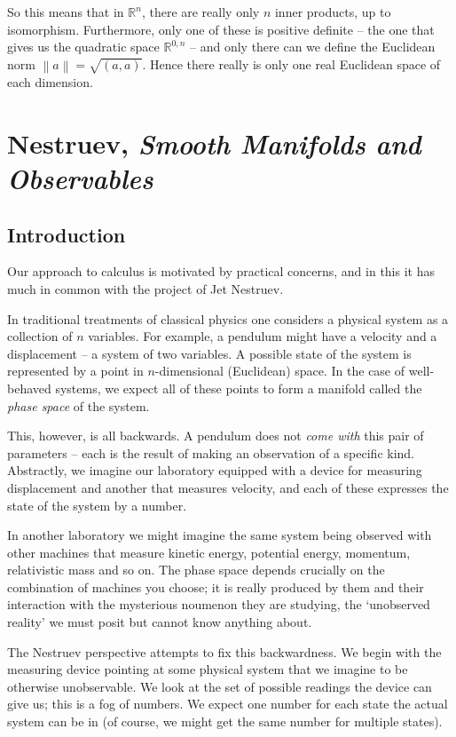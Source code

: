 \documentclass[oneside,english]{amsbook}
\numberwithin{section}{chapter}
\theoremstyle{plain}
\theoremstyle{definition}
\newcommand{\norm}[1]{\left\lVert#1\right\rVert}
\begin{document}
So this means that in $\mathbb{R}^n$, there are really only $n$ inner products, up to isomorphism. Furthermore, only one of these is positive definite -- the one that gives us the quadratic space $\mathbb{R}^{0, n}$ -- and only there can we define the Euclidean norm $\norm{a} = \sqrt{(a, a)}$. Hence there really is only one real Euclidean space of each dimension. 

\chapter{Nestruev, \emph{Smooth Manifolds and Observables}}

\section{Introduction}

Our approach to calculus is motivated by practical concerns, and in this it has much in common with the project of Jet Nestruev.

In traditional treatments of classical physics one considers a physical system as a collection of $n$ variables. For example, a pendulum might have a velocity and a displacement -- a system of two variables. A possible state of the system is represented by a point in $n$-dimensional (Euclidean) space. In the case of well-behaved systems, we expect all of these points to form a manifold called the \emph{phase space} of the system.

This, however, is all backwards. A pendulum does not \emph{come with} this pair of parameters -- each is the result of making an observation of a specific kind. Abstractly, we imagine our laboratory equipped with a device for measuring displacement and another that measures velocity, and each of these expresses the state of the system by a number. 

In another laboratory we might imagine the same system being observed with other machines that measure kinetic energy, potential energy, momentum, relativistic mass and so on. The phase space depends crucially on the combination of machines you choose; it is really produced by them and their interaction with the mysterious noumenon they are studying, the `unobserved reality' we must posit but cannot know anything about.

The Nestruev perspective attempts to fix this backwardness. We begin with the measuring device pointing at some physical system that we imagine to be otherwise unobservable. We look at the set of possible readings the device can give us; this is a fog of numbers. We expect one number for each state the actual system can be in (of course, we might get the same number for multiple states).
\end{document}
